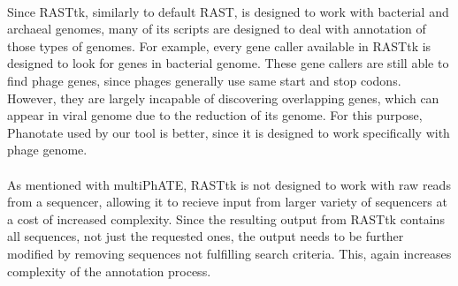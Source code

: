 \paragraph*{}
Since RASTtk, similarly to default RAST, is designed to work with bacterial and archaeal genomes, many of its scripts are designed to deal with annotation of those types of genomes. For example, every gene caller available in RASTtk is designed to look for genes in bacterial genome. These gene callers are still able to find phage genes, since phages generally use same start and stop codons. However, they are largely incapable of discovering overlapping genes, which can appear in viral genome due to the reduction of its genome. For this purpose, Phanotate used by our tool is better, since it is designed to work specifically with phage genome.
\paragraph*{}
As mentioned with multiPhATE, RASTtk is not designed to work with raw reads from a sequencer, allowing it to recieve input from larger variety of sequencers at a cost of increased complexity. Since the resulting output from RASTtk contains all sequences, not just the requested ones, the output needs to be further modified by removing sequences not fulfilling search criteria. This, again increases complexity of the annotation process.